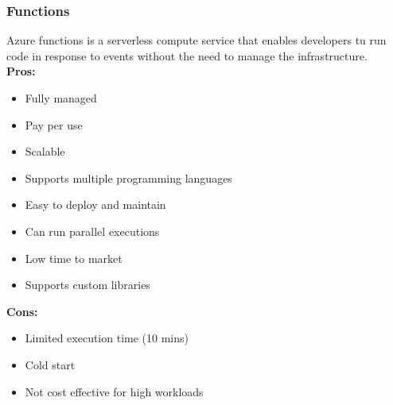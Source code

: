         \subsubsection{Functions}
        \label{azure:functions}
        Azure functions is a serverless compute service that enables developers tu run code in response to 
        events without the need to manage the infrastructure.\\
        \textbf{Pros:}
        \begin{itemize}
            \item Fully managed
            \item Pay per use
            \item Scalable
            \item Supports multiple programming languages
            \item Easy to deploy and maintain
            \item Can run parallel executions
            \item Low time to market
            \item Supports custom libraries
        \end{itemize}
        \textbf{Cons:}
        \begin{itemize}
            \item Limited execution time (10 mins)
            \item Cold start
            \item Not cost effective for high workloads
        \end{itemize}

